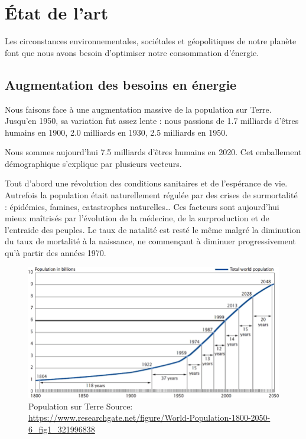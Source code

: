 \chapter{État de l’art}

Les circonstances environnementales, sociétales et géopolitiques de notre planète
font que nous avons besoin d'optimiser notre consommation d'énergie.


\section{Augmentation des besoins en énergie}

Nous faisons face à une augmentation massive de la population sur Terre.
Jusqu'en 1950, sa variation fut assez lente : nous passions de 1.7 milliards d'êtres humains
en 1900, 2.0 milliards en 1930, 2.5 milliards en 1950.

Nous sommes aujourd'hui 7.5 milliards d'êtres humains en 2020. Cet emballement démographique s'explique
par plusieurs vecteurs.

Tout d'abord une révolution des conditions sanitaires et de l'espérance de vie. Autrefois la population
était naturellement régulée par des crises de surmortalité : épidémies, famines, catastrophes naturelles\dots
Ces facteurs sont aujourd'hui mieux maîtrisés par l'évolution de la médecine, de la surproduction et de l'entraide des peuples.
Le taux de natalité est resté le même malgré la diminution du taux de mortalité à la naissance, ne commençant à
diminuer progressivement qu'à partir des années 1970.

\begin{figure}
  \centering
  \includegraphics[scale=0.35]{media/WorldPopulation.png}
  \caption{
      Population sur Terre\newline
      \tiny{Source:\newline
        \url{https://www.researchgate.net/figure/World-Population-1800-2050-6_fig1_321996838}
      }
  }
\end{figure}

